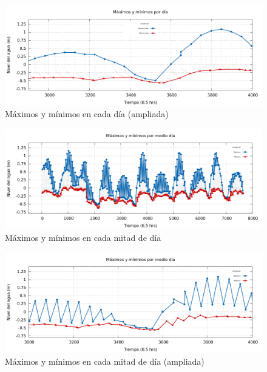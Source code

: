 \documentclass[paper=letter, fontsize=12pt,spanish]{article}
\begin{document}
\begin{figure}[ht!]
\centering
\includegraphics[scale=0.42]{dias2}
\caption{M\'aximos y m\'inimos en cada día (ampliada)}\label{resupsim}
\end{figure}


\begin{figure}[ht!]
\centering
\includegraphics[scale=0.42]{med}
\caption{M\'aximos y m\'inimos en cada mitad de día}\label{resupsim}
\end{figure}

\begin{figure}[ht!]
\centering
\includegraphics[scale=0.42]{med2}
\caption{M\'aximos y m\'inimos en cada mitad de día (ampliada)}\label{resupsim}
\end{figure}





\end{document}
